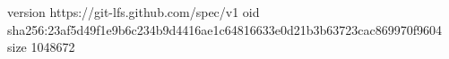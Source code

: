 version https://git-lfs.github.com/spec/v1
oid sha256:23af5d49f1e9b6c234b9d4416ae1c64816633e0d21b3b63723cac869970f9604
size 1048672
